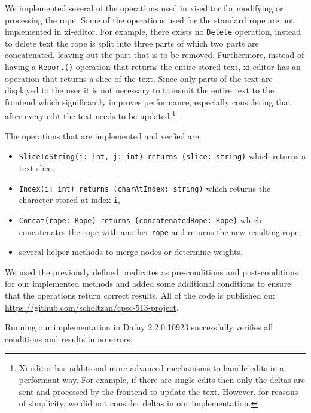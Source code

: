 We implemented several of the operations used in xi-editor for modifying or processing the rope.
Some of the operations used for the standard rope are not implemented in xi-editor. 
For example, there exists no \texttt{Delete} operation, instead to delete text the rope is split into three parts of which two parts are concatenated, leaving out the part that is to be removed.
Furthermore, instead of having a \texttt{Report()} operation that returns the entire stored text, xi-editor has an operation that returns a slice of the text.
Since only parts of the text are displayed to the user it is not necessary to transmit the entire text to the frontend which significantly improves performance, especially considering that after every edit the text needs to be updated.\footnote{Xi-editor has additional more advanced mechanisms to handle edits in a performant way. For example, if there are single edits then only the deltas are sent and processed by the frontend to update the text. However, for reasons of simplicity, we did not consider deltas in our implementation.}

The operations that are implemented and verfied are:
\begin{itemize} 
  \item \texttt{SliceToString(i: int, j: int) returns (slice: string)} which returns a text slice,
  \item \texttt{Index(i: int) returns (charAtIndex: string)} which returns the character stored at index \texttt{i},
  \item \texttt{Concat(rope: Rope) returns (concatenatedRope: Rope)} which concatenates the rope with another \texttt{rope} and returns the new resulting rope,
  \item several helper methods to merge nodes or determine weights.
\end{itemize}


We used the previously defined predicates as pre-conditions and post-conditions for our implemented methods and added some additional conditions to ensure that the operations return correct results.
All of the code is published on: \url{https://github.com/scholtzan/cpsc-513-project}.

Running our implementation in Dafny 2.2.0.10923 successfully verifies all conditions and results in no errors.


  